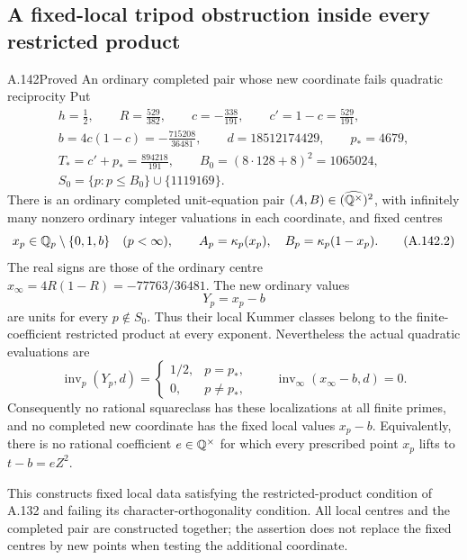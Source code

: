 \subsection{A fixed-local tripod obstruction inside every restricted product}

\begin{statement}{A.142}{Proved}
{An ordinary completed pair whose new coordinate fails quadratic reciprocity}
Put
\[
 \begin{gathered}
 h=\frac12,\qquad R=\frac{529}{382},\qquad
 c=-\frac{338}{191},\qquad c'=1-c=\frac{529}{191},\\
 b=4c(1-c)=-\frac{715208}{36481},\qquad
 d=18512174429,\qquad p_*=4679,\\
 T_* =c'+p_* =\frac{894218}{191},\qquad
 B_0=(8\cdot128+8)^2=1065024,\\
 S_0=\{p:p\le B_0\}\cup\{1119169\}.
 \end{gathered}
\tag{A.142.1}
\]
There is an ordinary completed unit-equation pair
\((A,B)\in(\widehat{\mathbb Q^\times})^2\), with infinitely many
nonzero ordinary integer valuations in each coordinate, and fixed
centres
\[
 x_p\in\mathbb Q_p\setminus\{0,1,b\}\quad(p<\infty),\qquad
 A_p=\kappa_p(x_p),\quad B_p=\kappa_p(1-x_p).
\tag{A.142.2}
\]
The real signs are those of the ordinary centre
\(x_\infty=4R(1-R)=-77763/36481\).
The new ordinary values
\[
                    Y_p=x_p-b
\tag{A.142.3}
\]
are units for every \(p\notin S_0\).  Thus their local Kummer
classes belong to the finite-coefficient restricted product at
every exponent.  Nevertheless the actual quadratic evaluations are
\[
 \operatorname{inv}_p(Y_p,d)=
 \begin{cases}
  1/2,&p=p_*,\\
  0,&p\ne p_*,
 \end{cases}
 \qquad \operatorname{inv}_\infty(x_\infty-b,d)=0.
\tag{A.142.4}
\]
Consequently no rational squareclass has these localizations at all
finite primes, and no completed new coordinate has the fixed local
values \(x_p-b\).  Equivalently, there is no rational coefficient
\(e\in\mathbb Q^\times\) for which every prescribed point \(x_p\) lifts
to \(t-b=eZ^2\).

This constructs fixed local data satisfying the restricted-product
condition of A.132 and failing its character-orthogonality condition.
All local centres and the completed pair are constructed together;
the assertion does not replace the fixed centres by new points when
testing the additional coordinate.
\end{statement}
